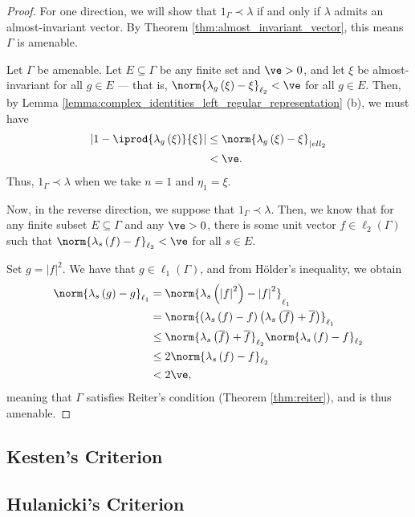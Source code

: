 \begin{proof}
  For one direction, we will show that $1_{\Gamma}\prec \lambda$ if and only if $\lambda$ admits an almost-invariant vector. By Theorem \ref{thm:almost_invariant_vector}, this means $\Gamma$ is amenable.\newline

  Let $\Gamma$ be amenable. Let $E\subseteq \Gamma$ be any finite set and $\ve > 0$, and let $\xi$ be almost-invariant for all $g\in E$ --- that is, $\norm{\lambda_g\left( \xi \right) - \xi}_{\ell_2} < \ve$ for all $g\in E$. Then, by Lemma \ref{lemma:complex_identities_left_regular_representation} (b), we must have
  \begin{align*}
    \left\vert 1 - \iprod{\lambda_g\left( \xi \right)}{\xi} \right\vert &\leq \norm{\lambda_g\left( \xi \right) - \xi}_{|ell_2}\\
    &< \ve.
  \end{align*}
  Thus, $1_{\Gamma}\prec \lambda$ when we take $n = 1$ and $\eta_1 = \xi$.\newline

  Now, in the reverse direction, we suppose that $1_{\Gamma}\prec \lambda$. Then, we know that for any finite subset $E\subseteq \Gamma$ and any $\ve > 0$, there is some unit vector $f\in \ell_2\left( \Gamma \right)$ such that $\norm{\lambda_s\left( f \right) - f}_{\ell_2} < \ve$ for all $s\in E$.\newline

  Set $g = \left\vert f \right\vert^2$. We have that $g\in \ell_1\left( \Gamma \right)$, and from Hölder's inequality, we obtain
  \begin{align*}
    \norm{\lambda_s\left( g \right) - g}_{\ell_1} &= \norm{\lambda_s\left( \left\vert f \right\vert^2 \right) - \left\vert f \right\vert^2}_{\ell_1}\\
                                                  &= \norm{\left( \lambda_s\left( f \right) - f \right)\left( \lambda_s\left( \overline{f} \right) + \overline{f} \right)}_{\ell_1}\\
                                                  &\leq \norm{\lambda_s\left( \overline{f} \right) + \overline{f}}_{\ell_2}\norm{\lambda_s\left( f \right) - f}_{\ell_2}\\
                                                  &\leq 2\norm{\lambda_s\left( f \right) - f}_{\ell_2}\\
                                                  & < 2\ve,
  \end{align*}
  meaning that $\Gamma$ satisfies Reiter's condition (Theorem \ref{thm:reiter}), and is thus amenable.
\end{proof}

\subsection{Kesten's Criterion}%
\subsection{Hulanicki's Criterion}%
